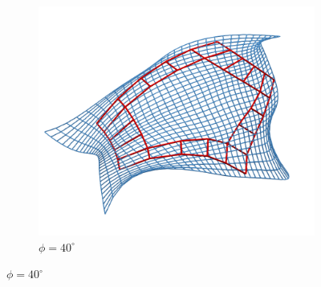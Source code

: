 \documentclass[9pt,academicons]{article}
\begin{document}
\begin{figure}[!ht]
{    \begin{subfigure}{.26\textwidth}
      \includegraphics[width=\textwidth]{images/rotations/40.png}
      \caption{$\phi=40^\circ$}
    \end{subfigure}
    \hfill
  }


\end{figure}
\end{document}
